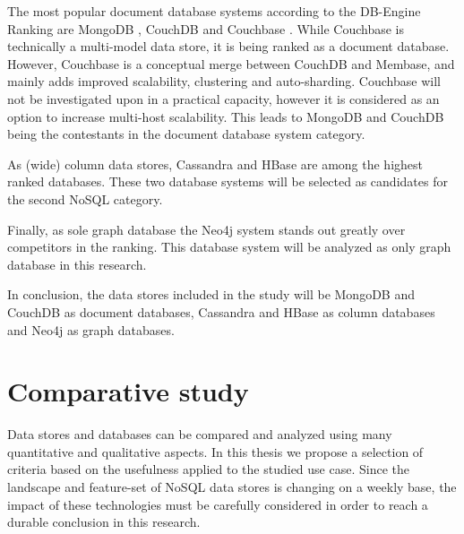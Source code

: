 The most popular document database systems according to the DB-Engine Ranking are MongoDB \autocite{MongoDB2009}, CouchDB \autocite{CouchDB2005} and Couchbase \autocite{Couchbase2010}. While Couchbase is technically a multi-model data store, it is being ranked as a document database. However, Couchbase is a conceptual merge between CouchDB and Membase, and mainly adds improved scalability, clustering and auto-sharding. Couchbase will not be investigated upon in a practical capacity, however it is considered as an option to increase multi-host scalability. This leads to MongoDB and CouchDB being the contestants in the document database system category.

As (wide) column data stores, Cassandra \autocite{Cassandra2008} and HBase \autocite{HBase2005} are among the highest ranked databases. These two database systems will be selected as candidates for the second NoSQL category.

Finally, as sole graph database the Neo4j system \autocite{Neo4j2007} stands out greatly over competitors in the ranking. This database system will be analyzed as only graph database in this research.

In conclusion, the data stores included in the study will be MongoDB and CouchDB as document databases, Cassandra and HBase as column databases and Neo4j as graph databases.

\section{Comparative study}
\label{sec:comparative study}

Data stores and databases can be compared and analyzed using many quantitative and qualitative aspects. In this thesis we propose a selection of criteria based on the usefulness applied to the studied use case. Since the landscape and feature-set of NoSQL data stores is changing on a weekly base, the impact of these technologies must be carefully considered in order to reach a durable conclusion in this research.

  
